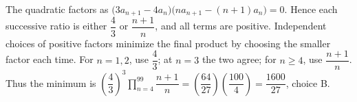 The quadratic factors as $\bigl(3a_{n+1}-4a_n\bigr)\bigl(na_{n+1}-(n+1)a_n\bigr)=0$. Hence each successive ratio is either $\dfrac{4}{3}$ or $\dfrac{n+1}{n}$, and all terms are positive. Independent choices of positive factors minimize the final product by choosing the smaller factor each time. For $n=1,2$, use $\dfrac{4}{3}$; at $n=3$ the two agree; for $n\ge 4$, use $\dfrac{n+1}{n}$. Thus the minimum is $(\dfrac{4}{3})^3\prod_{n=4}^{99}\dfrac{n+1}{n}=(\dfrac{64}{27})(\dfrac{100}{4})=\boxed{\dfrac{1600}{27}}$, choice B.
